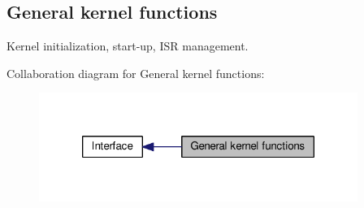 \hypertarget{group__kern__general}{\subsection{General kernel functions}
\label{group__kern__general}
}


Kernel initialization, start-\/up, I\-S\-R management.  


Collaboration diagram for General kernel functions\-:\nopagebreak
\begin{figure}[H]
\begin{center}
\leavevmode
\includegraphics[width=294pt]{group__kern__general}
\end{center}
\end{figure}
